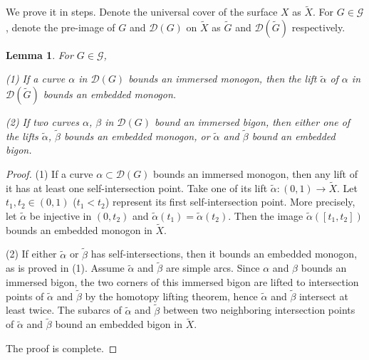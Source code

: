 \documentclass[UTF8]{amsart}
\newtheorem{lemma}[theorem]{Lemma}
\numberwithin{equation}{section}
\theoremstyle{definition}
\theoremstyle{example}
\theoremstyle{remark}
\begin{document}
\noindent We prove it in steps. Denote the universal cover of the surface $X$ as $ \widetilde{X}$. For $G\in \mathcal{G}$, denote the pre-image of $G$ and $ \mathcal{D}(G)$ on $ \widetilde{X}$ as $ \widetilde{G}$ and $\mathcal{D}(\widetilde{G})$ respectively. 

\begin{lemma}
	For $G\in \mathcal{G}$, 

	(1) If a curve $\alpha$ in $\mathcal{D}(G)$ bounds an immersed monogon, then the lift $ \widetilde{\alpha}$ of $\alpha$ in $\mathcal{D}(\widetilde{G})$ bounds an embedded monogon. 

	(2) If two curves $\alpha$, $\beta$ in $\mathcal{D}(G)$ bound an immersed bigon, then either one of the lifts $ \widetilde{\alpha}$, $ \widetilde{\beta}$ bounds an embedded monogon, or $ \widetilde{\alpha}$ and $ \widetilde{\beta}$ bound an embedded bigon. 
	
	\label{lem:lift_embed}
\end{lemma}
\begin{proof}
	(1) If a curve $\alpha \subset \mathcal{D}(G) $ bounds an immersed monogon, then any lift of it has at least one self-intersection point. Take one of its lift $ \widetilde{\alpha}: (0,1) \to \widetilde{X}$. Let $t_1, t_2 \in (0,1)$ ($t_1<t_2$) represent its first self-intersection point. More precisely, let $ \widetilde{\alpha}$ be injective in $(0,t_2)$ and $ \widetilde{\alpha}(t_1) = \widetilde{\alpha}(t_2)$. Then  the image $ \widetilde{\alpha}([t_1,t_2])$ bounds an embedded monogon in $ \widetilde{X}$. 

	(2) If either $ \widetilde{\alpha}$ or $ \widetilde{\beta}$ has self-intersections, then it bounds an embedded monogon, as is proved in (1). Assume $ \widetilde{\alpha}$ and $ \widetilde{\beta}$ are simple arcs. Since $\alpha$ and $\beta$ bounds an immersed bigon, the two corners of this immersed bigon are lifted to intersection points of $ \widetilde{\alpha}$ and $ \widetilde{\beta}$ by the homotopy lifting theorem, hence $ \widetilde{\alpha}$ and $ \widetilde{\beta}$ intersect at least twice. The subarcs of $ \widetilde{\alpha}$ and $ \widetilde{\beta}$ between two neighboring intersection points of $ \widetilde{\alpha}$ and $ \widetilde{\beta}$ bound an embedded bigon in $ \widetilde{X}$. 

	The proof is complete. 
\end{proof}
\end{document}
